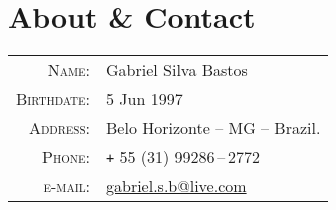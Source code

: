 \documentclass[a4paper,10pt]{article}
\renewcommand\#{\protect\scalebox{0.8}{\protect\raisebox{0.4ex}{\char"0023}}}
\begin{document}
\pagestyle{empty} %

\par{
  \bigskip
  \par
}

\section{About {\normalfont\&} Contact}

\begin{tabular}{rl}
  \textsc{Name:}      & Gabriel Silva Bastos \\
  \textsc{Birthdate:} & 5 Jun 1997 \\
  \textsc{Address:}   & Belo Horizonte -- MG -- Brazil. \\
  \textsc{Phone:}     & \texttt{+} 55 (31) 99286\,--\,2772 \\
  \textsc{e-mail:}    & \href{mailto:gabriel.s.b@live.com}{gabriel.s.b@live.com}
\end{tabular}
\end{document}
